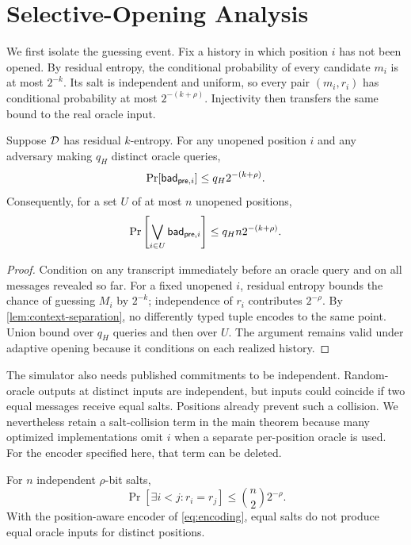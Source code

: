 \section{Selective-Opening Analysis}
\label{sec:analysis}

We first isolate the guessing event.  Fix a history in which position $i$ has
not been opened.  By residual entropy, the conditional probability of every
candidate $m_i$ is at most $2^{-k}$.  Its salt is independent and uniform, so
every pair $(m_i,r_i)$ has conditional probability at most $2^{-(k+\rho)}$.
Injectivity then transfers the same bound to the real oracle input.

\begin{lemma}
\label{lem:prequery}
Suppose $\mathcal{D}$ has residual $k$-entropy.  For any unopened position $i$ and
any adversary making $q_H$ distinct oracle queries,
\[
  \Pr[\mathsf{bad}_{\mathsf{pre},i}]\leq q_H2^{-(k+\rho)}.
\]
Consequently, for a set $U$ of at most $n$ unopened positions,
\[
  \Pr\left[\bigvee_{i\in U}\mathsf{bad}_{\mathsf{pre},i}\right]
  \leq q_Hn2^{-(k+\rho)}.
\]
\end{lemma}

\begin{proof}
Condition on any transcript immediately before an oracle query and on all
messages revealed so far.  For a fixed unopened $i$, residual entropy bounds
the chance of guessing $M_i$ by $2^{-k}$; independence of $r_i$ contributes
$2^{-\rho}$.  By \cref{lem:context-separation}, no differently typed tuple
encodes to the same point.  Union bound over $q_H$ queries and then over $U$.
The argument remains valid under adaptive opening because it conditions on
each realized history.
\end{proof}

The simulator also needs published commitments to be independent.  Random-
oracle outputs at distinct inputs are independent, but inputs could coincide
if two equal messages receive equal salts.  Positions already prevent such a
collision.  We nevertheless retain a salt-collision term in the main theorem
because many optimized implementations omit $i$ when a separate per-position
oracle is used.  For the encoder specified here, that term can be deleted.

\begin{lemma}
\label{lem:salt-collision}
For $n$ independent $\rho$-bit salts,
\[
  \Pr[\exists i<j:r_i=r_j]\leq\binom{n}{2}2^{-\rho}.
\]
With the position-aware encoder of \cref{eq:encoding}, equal salts do not
produce equal oracle inputs for distinct positions.
\end{lemma}


